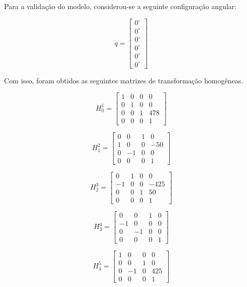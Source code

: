 Para a validação do modelo, considerou-se a seguinte configuração angular:

\begin{equation}
q =
\begin{bmatrix}
0^\circ \\
0^\circ \\
0^\circ \\
0^\circ \\
0^\circ \\
0^\circ
\end{bmatrix}
\end{equation}

Com isso, foram obtidos as seguintes matrizes de transformação homogêneas.

\begin{equation}
H_0^1=
\begin{bmatrix}
1 & 0 & 0 & 0\\
0 & 1 & 0 & 0\\
0 & 0 & 1 & 478\\
0 & 0 & 0 & 1
\end{bmatrix}
\end{equation}

\begin{equation}
H_1^2=
\begin{bmatrix}
0 & 0 & 1 & 0\\
1 & 0 & 0 & -50\\
0 & -1 & 0 & 0\\
0 & 0 & 0 & 1
\end{bmatrix}
\end{equation}

\begin{equation}
H_2^3=
\begin{bmatrix}
0 & 1 & 0 & 0\\
-1 & 0 & 0 & -425\\
0 & 0 & 1 & 50\\
0 & 0 & 0 & 1
\end{bmatrix}
\end{equation}

\begin{equation}
H_3^4=
\begin{bmatrix}
0 & 0 & 1 & 0\\
-1 & 0 & 0 & 0\\
0 & -1 & 0 & 0\\
0 & 0 & 0 & 1
\end{bmatrix}
\end{equation}

\begin{equation}
H_4^5=
\begin{bmatrix}
1 & 0 & 0 & 0\\
0 & 0 & 1 & 0\\
0 & -1 & 0 & 425\\
0 & 0 & 0 & 1
\end{bmatrix}
\end{equation}

